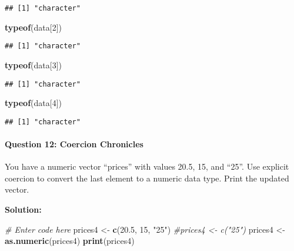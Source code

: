 \documentclass[
]{article}
\newenvironment{Shaded}{\begin{snugshade}}{\end{snugshade}}
\newcommand{\CommentTok}[1]{\textcolor[rgb]{0.56,0.35,0.01}{\textit{#1}}}
\newcommand{\DecValTok}[1]{\textcolor[rgb]{0.00,0.00,0.81}{#1}}
\newcommand{\FloatTok}[1]{\textcolor[rgb]{0.00,0.00,0.81}{#1}}
\newcommand{\FunctionTok}[1]{\textcolor[rgb]{0.13,0.29,0.53}{\textbf{#1}}}
\newcommand{\NormalTok}[1]{#1}
\newcommand{\OtherTok}[1]{\textcolor[rgb]{0.56,0.35,0.01}{#1}}
\newcommand{\StringTok}[1]{\textcolor[rgb]{0.31,0.60,0.02}{#1}}
\begin{document}
\begin{verbatim}
## [1] "character"
\end{verbatim}

\begin{Shaded}
\begin{Highlighting}[]
\FunctionTok{typeof}\NormalTok{(data[}\DecValTok{2}\NormalTok{])}
\end{Highlighting}
\end{Shaded}

\begin{verbatim}
## [1] "character"
\end{verbatim}

\begin{Shaded}
\begin{Highlighting}[]
\FunctionTok{typeof}\NormalTok{(data[}\DecValTok{3}\NormalTok{])}
\end{Highlighting}
\end{Shaded}

\begin{verbatim}
## [1] "character"
\end{verbatim}

\begin{Shaded}
\begin{Highlighting}[]
\FunctionTok{typeof}\NormalTok{(data[}\DecValTok{4}\NormalTok{])}
\end{Highlighting}
\end{Shaded}

\begin{verbatim}
## [1] "character"
\end{verbatim}

\hypertarget{question-12-coercion-chronicles}{%
\paragraph{Question 12: Coercion
Chronicles}\label{question-12-coercion-chronicles}}

You have a numeric vector ``prices'' with values 20.5, 15, and ``25''.
Use explicit coercion to convert the last element to a numeric data
type. Print the updated vector.

\textbf{Solution:}

\begin{Shaded}
\begin{Highlighting}[]
\CommentTok{\# Enter code here}
\NormalTok{prices4 }\OtherTok{\textless{}{-}} \FunctionTok{c}\NormalTok{(}\FloatTok{20.5}\NormalTok{, }\DecValTok{15}\NormalTok{, }\StringTok{"25"}\NormalTok{)}
\CommentTok{\#prices4 \textless{}{-} c("25")}
\NormalTok{prices4 }\OtherTok{\textless{}{-}} \FunctionTok{as.numeric}\NormalTok{(prices4)}
\FunctionTok{print}\NormalTok{(prices4)}
\end{Highlighting}
\end{Shaded}
\end{document}
